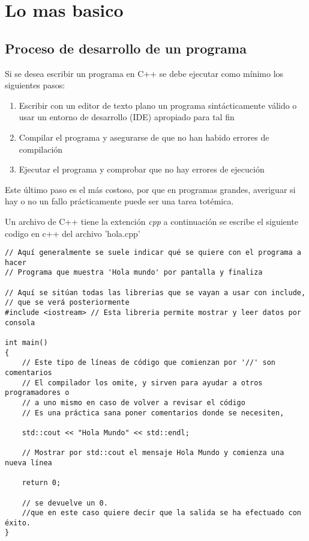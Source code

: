\section{Lo mas basico}

\subsection{Proceso de desarrollo de un programa}

Si se desea escribir un programa en C++ se debe ejecutar como mínimo los siguientes pasos:
\begin{enumerate}
\item Escribir con un editor de texto plano un programa sintácticamente válido o usar un entorno de desarrollo (IDE) apropiado para tal fin
\item Compilar el programa y asegurarse de que no han habido errores de compilación
\item Ejecutar el programa y comprobar que no hay errores de ejecución
\end{enumerate}
Este último paso es el más costoso, por que en programas grandes, averiguar si hay o no un fallo prácticamente puede ser una tarea totémica.

Un archivo de C++ tiene la extención \textit{cpp} a continuación se escribe el siguiente codigo en c++ del archivo 'hola.cpp'

\begin{lstlisting}[style=Cpp, label=hola-mundo, caption=Hola Mundo]
// Aquí generalmente se suele indicar qué se quiere con el programa a hacer
// Programa que muestra 'Hola mundo' por pantalla y finaliza

// Aquí se sitúan todas las librerias que se vayan a usar con include,
// que se verá posteriormente
#include <iostream> // Esta libreria permite mostrar y leer datos por consola

int main()
{
    // Este tipo de líneas de código que comienzan por '//' son comentarios
    // El compilador los omite, y sirven para ayudar a otros programadores o
    // a uno mismo en caso de volver a revisar el código
    // Es una práctica sana poner comentarios donde se necesiten,

    std::cout << "Hola Mundo" << std::endl;

    // Mostrar por std::cout el mensaje Hola Mundo y comienza una nueva línea
    
    return 0;

    // se devuelve un 0.
    //que en este caso quiere decir que la salida se ha efectuado con éxito.
}
\end{lstlisting}

